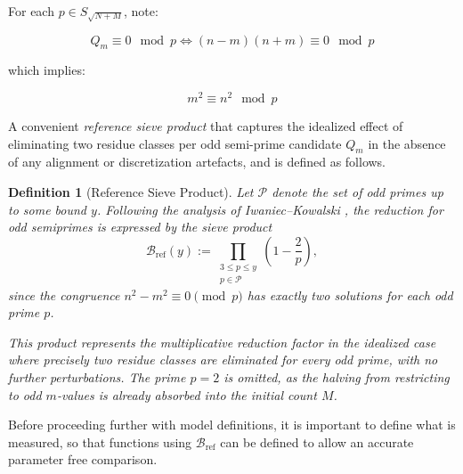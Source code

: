\documentclass[11pt]{article}
\theoremstyle{inline}
\theoremstyle{break}
\theoremstyle{break}
\theoremstyle{break}
\theoremstyle{break}
\theoremstyle{break}
\theoremstyle{break}
\theoremstyle{break}
\newtheorem{definition}{Definition}
\theoremstyle{inline}
\newcommand{\tref}{{\scriptscriptstyle\mathrm{ref}}}
\newcommand{\Bref}{\mathcal{B}_\tref}
\begin{document}
For each \( p \in S_{\sqrt{N+M}} \), note:

\begin{equation}
Q_m \equiv 0 \mod p \iff (n - m)(n + m) \equiv 0 \mod p
\end{equation}

which implies:

\begin{equation}
m^2 \equiv n^2 \mod p
\end{equation}

A convenient \emph{reference sieve product} that captures the idealized effect of
eliminating two residue classes per odd semi-prime candidate \( Q_m \) in the absence of any
alignment or discretization artefacts, and is defined as follows.

\begin{definition}[Reference Sieve Product]
\label{def:Bref}
Let \( \mathcal{P} \) denote the set of odd primes up to some bound \( y \).
Following the analysis of Iwaniec–Kowalski \cite{IwaniecKowalski2004}, the reduction for odd semiprimes is expressed by the sieve product
\begin{equation}
\Bref(y)
    := \prod_{\substack{3 \le p \le y \\ p \in \mathcal{P}}}
       \left( 1 - \frac{2}{p} \right),
\end{equation}
since the congruence \( n^2 - m^2 \equiv 0 \pmod{p} \) has exactly two solutions for each odd prime \( p \).

This product represents the multiplicative reduction factor in the
\emph{idealized} case where precisely two residue classes are eliminated
for every odd prime, with no further perturbations. The prime \( p = 2 \)
is omitted, as the halving from restricting to odd \( m \)-values is already
absorbed into the initial count \( M \).
\end{definition}

Before proceeding further with model definitions, it is important to define what is measured, so that functions using \( \Bref \) can be 
defined to allow an accurate parameter free comparison.
\end{document}
